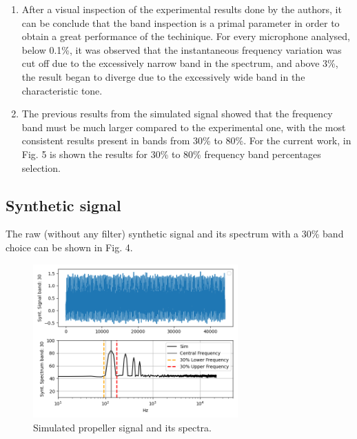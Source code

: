 \documentclass[10pt,fleqn,a4paper,twoside]{article}
\begin{document}
\begin{enumerate}
    \item After a visual inspection of the experimental results done by the authors, it can be conclude that the band inspection is a primal parameter in order to obtain a great performance of the techinique. For every microphone analysed, below 0.1\%, it was observed that the instantaneous frequency variation was cut off due to the excessively narrow band in the spectrum, and above 3\%, the result began to diverge due to the excessively wide band in the characteristic tone. 
    \item The previous results from the simulated signal showed that the frequency band must be much larger compared to the experimental one, with the most consistent results present in bands from 30\% to 80\%. For the current work, in Fig. 5 is shown the results for 30\% to 80\% frequency band percentages selection.
\end{enumerate}

\subsection{Synthetic signal}
The raw (without any filter) synthetic signal and its spectrum with a 30\% band choice can be shown in Fig. 4.
\begin{figure}[h!]
    \centering
    \includegraphics[width=0.7\textwidth]{Figures/simulated_spectrum_band_30.png}
    \caption{Simulated propeller signal and its spectra.}
    \label{fig4}
    \end{figure}
    
\end{document}
